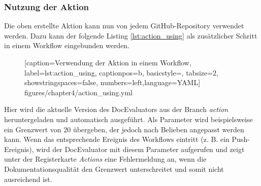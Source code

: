 \subsubsection{Nutzung der Aktion}

Die oben erstellte Aktion kann nun von jedem GitHub-Repository verwendet werden. Dazu kann der folgende Listing \ref{lst:action_using} als zusätzlicher Schritt in einem Workflow eingebunden werden. 
\begin{figure} [htbp]

[caption={Verwendung der Aktion in einem Workflow},
label={lst:action_using},
captionpos=b, basicstyle=\footnotesize, tabsize=2, showstringspaces=false,  numbers=left,language=YAML]
{figures/chapter4/action_using.yml}
\end{figure}

Hier wird die aktuelle Version des DocEvaluators aus der Branch \textit{action} heruntergeladen und automatisch ausgeführt. Als Parameter wird beispielsweise ein Grenzwert von 20 übergeben, der jedoch nach Belieben angepasst werden kann. Wenn das entsprechende Ereignis des Workflows eintritt (z. B. ein Push-Ereignis), wird der DocEvaluator mit diesem Parameter aufgerufen und zeigt unter der Registerkarte \textit{Actions} eine Fehlermeldung an, wenn die Dokumentationsqualität den Grenzwert unterschreitet und somit nicht ausreichend ist.
\begin{comment}
Das Tool \textit{create\_conf}, das im Hauptverzeichnis im GitHub-Repository liegt, kann ein Workflow erstellen, indem \textit{node create\_conf.js --out PATH --type yaml} aufgerufen wird. Dieses kleine Hilfstool erzeugt dann ein beispielhafter Workflow mit allen Eingaben in dem angegebenen Pfad, um es leicht in GitHub einzubinden.
\end{comment}
